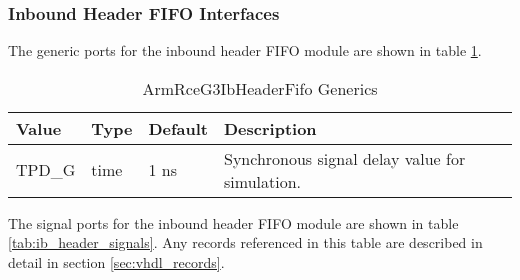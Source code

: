 \documentclass[11pt]{article}
\begin{document}
\subsubsection{Inbound Header FIFO Interfaces}

The generic ports for the inbound header FIFO module are shown in table \ref{tab:ib_header_generics}.

\begin{table}[H]
\small
\centering
   \begin{tabular}{| l | l | l | l | }
      \hline \textbf{Value} & \textbf{Type} & \textbf{Default} & \textbf{Description} \\
      \hline TPD\_G          & time     & 1 ns & Synchronous signal delay value for simulation.    \\
      \hline
   \end{tabular}
   \caption{ArmRceG3IbHeaderFifo Generics}
   \label{tab:ib_header_generics}
\end{table}

The signal ports for the inbound header FIFO module are shown in table \ref{tab:ib_header_signals}.
Any records referenced in this table are described in detail in section \ref{sec:vhdl_records}. 
\end{document}
